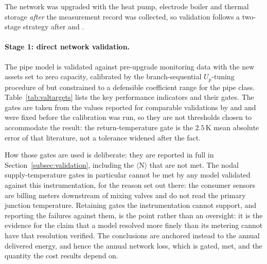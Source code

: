 
The network was upgraded with the heat pump, electrode boiler and thermal storage
\emph{after} the measurement record was collected, so validation follows a two-stage
strategy after \citet{Kus2025} and \citet{Maldonado2024}.

\paragraph{Stage 1: direct network validation.}
The pipe model is validated against pre-upgrade monitoring data with the new assets set to
zero capacity, calibrated by the branch-sequential $U_p$-tuning procedure of
\citet{Maldonado2024} but constrained to a defensible coefficient range for the pipe class.
Table~\ref{tab:valtargets} lists the key performance indicators and their gates. The gates
are taken from the values reported for comparable validations by \citet{Maldonado2024} and
\citet{Kus2025} and were fixed before the calibration was run, so they are not thresholds
chosen to accommodate the result: the return-temperature gate is the $2.5$\,K mean absolute
error of that literature, not a tolerance widened after the fact.

How those gates are used is deliberate: they are reported in full in
Section~\ref{subsec:validation}, including the $\langle$N$\rangle$ that are not met. The
nodal supply-temperature gates in particular cannot be met by any model validated against
this instrumentation, for the reason set out there: the consumer sensors are billing meters
downstream of mixing valves and do not read the primary junction temperature. Retaining
gates the instrumentation cannot support, and reporting the failures against them, is the
point rather than an oversight: it is the evidence for the claim that a model resolved more
finely than its metering cannot have that resolution verified. The conclusions are anchored
instead to the annual delivered energy, and hence the annual network loss, which is gated,
met, and the quantity the cost results depend on.

